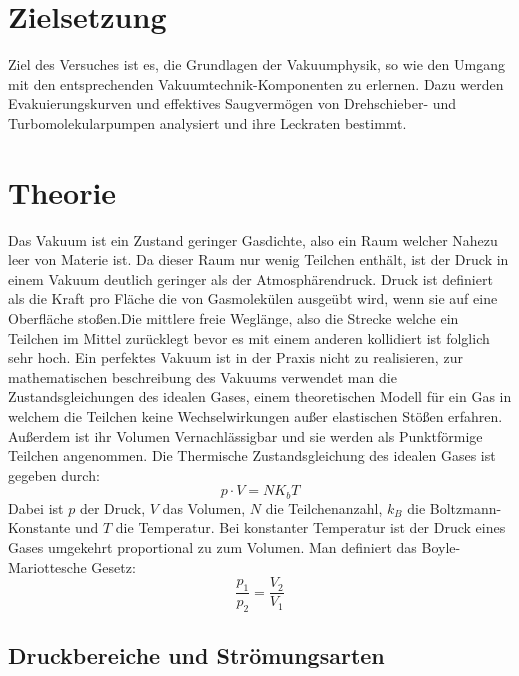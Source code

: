 
\section{Zielsetzung}
\label{sec:Zielsetzung}
Ziel des Versuches ist es, die Grundlagen der Vakuumphysik, so wie den Umgang mit
den entsprechenden Vakuumtechnik-Komponenten zu erlernen. Dazu werden Evakuierungskurven und effektives Saugvermögen 
von Drehschieber- und Turbomolekularpumpen analysiert und ihre Leckraten bestimmt.


\section{Theorie}
\label{sec:Theorie}

Das Vakuum ist ein Zustand geringer Gasdichte, also ein Raum welcher Nahezu leer von Materie ist.
Da dieser Raum nur wenig Teilchen enthält, ist der Druck in einem Vakuum deutlich geringer als der Atmosphärendruck.
Druck ist definiert als die Kraft pro Fläche die von Gasmolekülen ausgeübt wird, wenn sie auf
eine Oberfläche stoßen.Die mittlere freie Weglänge, also die Strecke welche ein Teilchen im Mittel zurücklegt bevor es
mit einem anderen kollidiert ist folglich sehr hoch. Ein perfektes Vakuum ist in der Praxis nicht zu realisieren, zur mathematischen 
beschreibung des Vakuums verwendet man die Zustandsgleichungen des idealen Gases, einem theoretischen Modell für ein 
Gas in welchem die Teilchen keine Wechselwirkungen außer elastischen Stößen erfahren. Außerdem ist ihr Volumen Vernachlässigbar 
und sie werden als Punktförmige Teilchen angenommen.
Die Thermische Zustandsgleichung des idealen Gases ist gegeben durch:
\begin{equation}
     p \cdot V=NK_bT 
\end{equation}  
Dabei ist \( p \) der Druck, \( V \) das Volumen, \( N \) die Teilchenanzahl, \( k_B \) die Boltzmann-Konstante
 und \( T \) die Temperatur.
Bei konstanter Temperatur ist der Druck eines Gases umgekehrt proportional zu zum Volumen. 
Man definiert das Boyle-Mariottesche Gesetz:
\begin{equation}
    \frac{p_1}{p_2}=  \frac{V_2}{V_1} 
\end{equation}


\subsection{Druckbereiche und Strömungsarten}


